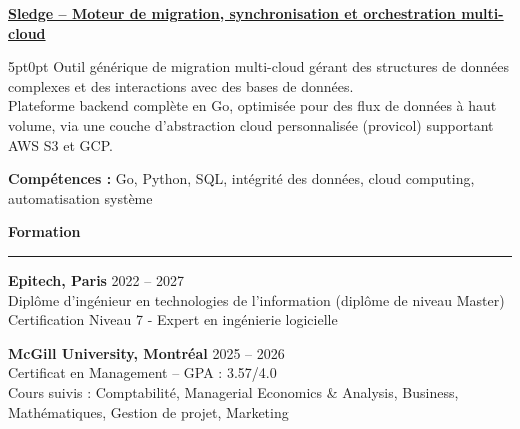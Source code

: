 \documentclass[9pt]{extarticle}
\begin{document}
\par\vspace{8pt}

\underline{\bfseries Sledge -- Moteur de migration, synchronisation et orchestration multi-cloud}
\par
\begin{adjustwidth}{5pt}{0pt}
    Outil générique de migration multi-cloud gérant des structures de données complexes et des interactions avec des bases de données. \\
    Plateforme backend complète en Go, optimisée pour des flux de données à haut volume, via une couche d'abstraction cloud personnalisée ({\ttfamily provicol}) supportant AWS S3 et GCP.
\end{adjustwidth}
\par
{\bfseries Compétences :} Go, Python, SQL, intégrité des données, cloud computing, automatisation système

\par\vspace{8pt}

{\large\bfseries Formation}
\par\vspace{-8pt}
\rule{\linewidth}{0.4pt}
\par\vspace{5pt}

{\bfseries Epitech, Paris} \hfill 2022 -- 2027 \\
Diplôme d'ingénieur en technologies de l'information (diplôme de niveau Master) \\
Certification Niveau 7 - Expert en ingénierie logicielle

\vspace{6pt}

{\bfseries McGill University, Montréal} \hfill 2025 -- 2026 \\
Certificat en Management -- GPA : 3.57/4.0 \\
Cours suivis : Comptabilité, Managerial Economics \& Analysis, Business, Mathématiques, Gestion de projet, Marketing
\end{document}
